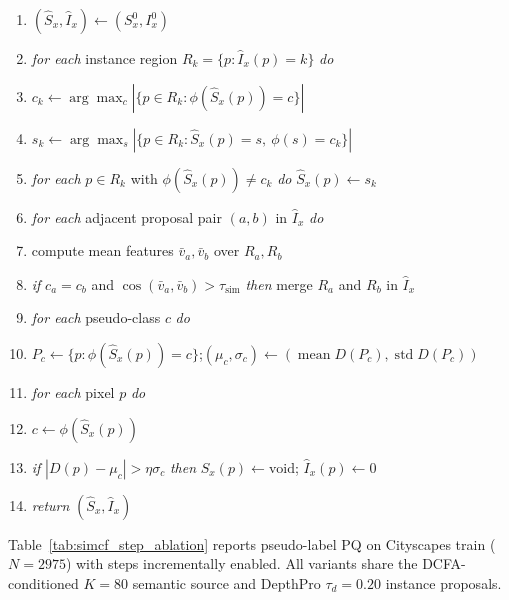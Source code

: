 \documentclass{article}
\begin{document}
\begin{algobox}[H]
\caption{SIMCF$(S_x^0,I_x^0,D,\phi,v;\tau_\text{sim},\eta)$. $\phi$ maps over-clusters to the 27-class CAUSE taxonomy, and $v$ is dense DINOv3 features.}
\label{alg:simcf}
\begin{enumerate}
\setlength{\itemsep}{0pt}
\item $(\hat S_x,\hat I_x) \gets (S_x^0,I_x^0)$
\item \textit{for each} instance region $R_k=\{p:\hat I_x(p)=k\}$ \textit{do}
\item \quad $c_k \gets \arg\max_c |\{p\in R_k:\phi(\hat S_x(p))=c\}|$
\item \quad $s_k \gets \arg\max_s |\{p\in R_k:\hat S_x(p)=s,\ \phi(s)=c_k\}|$
\item \quad \textit{for each} $p\in R_k$ with $\phi(\hat S_x(p))\ne c_k$ \textit{do} $\hat S_x(p)\gets s_k$
\item \textit{for each} adjacent proposal pair $(a,b)$ in $\hat I_x$ \textit{do}
\item \quad compute mean features $\bar v_a,\bar v_b$ over $R_a,R_b$
\item \quad \textit{if} $c_a=c_b$ and $\cos(\bar v_a,\bar v_b)>\tau_\text{sim}$ \textit{then} merge $R_a$ and $R_b$ in $\hat I_x$
\item \textit{for each} pseudo-class $c$ \textit{do}
\item \quad $P_c\gets\{p:\phi(\hat S_x(p))=c\}$;\quad $(\mu_c,\sigma_c)\gets(\operatorname{mean}D(P_c),\operatorname{std}D(P_c))$
\item \textit{for each} pixel $p$ \textit{do}
\item \quad $c\gets\phi(\hat S_x(p))$
\item \quad \textit{if} $|D(p)-\mu_c|>\eta\sigma_c$ \textit{then} $\hat S_x(p)\gets\mathrm{void}$; $\hat I_x(p)\gets0$
\item \textit{return} $(\hat S_x,\hat I_x)$
\end{enumerate}
\end{algobox}

Table~\ref{tab:simcf_step_ablation} reports pseudo-label PQ on Cityscapes train ($N{=}2975$) with steps incrementally enabled. All variants share the DCFA-conditioned $K{=}80$ semantic source and DepthPro $\tau_d{=}0.20$ instance proposals.
\end{document}
